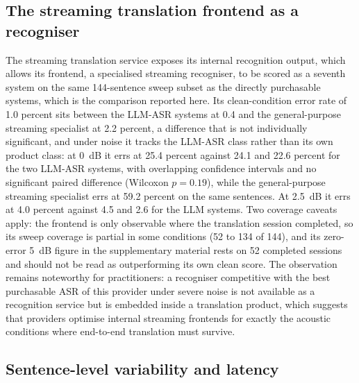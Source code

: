 \subsection{The streaming translation frontend as a recogniser}
\label{sec:results:frontend}

The streaming translation service exposes its internal recognition output,
which allows its frontend, a specialised streaming recogniser, to be scored
as a seventh system on the same 144-sentence sweep subset as the directly
purchasable systems, which is the comparison reported here. Its
clean-condition error rate of 1.0 percent sits between the LLM-ASR systems
at 0.4 and the general-purpose streaming specialist at 2.2 percent, a
difference that is not individually significant, and
under noise it tracks the LLM-ASR class rather than its own product class:
at 0~dB it errs at 25.4 percent against 24.1 and 22.6 percent for the two
LLM-ASR systems, with overlapping confidence intervals and no significant
paired difference (Wilcoxon $p=0.19$), while the general-purpose streaming
specialist errs at 59.2 percent on the same sentences. At 2.5~dB it errs at
4.0 percent against 4.5 and 2.6 for the LLM systems. Two coverage caveats
apply: the frontend is only observable where the translation session
completed, so its sweep coverage is partial in some conditions (52 to 134 of
144), and its zero-error 5~dB figure in the supplementary material rests on 52 completed
sessions and should not be read as outperforming its own clean score. The
observation remains noteworthy for practitioners: a recogniser competitive
with the best purchasable ASR of this provider under severe noise is not
available as a recognition service but is embedded inside a translation
product, which suggests that providers optimise internal streaming
frontends for exactly the acoustic conditions where end-to-end translation
must survive.

\subsection{Sentence-level variability and latency}
\label{sec:results:latency}

